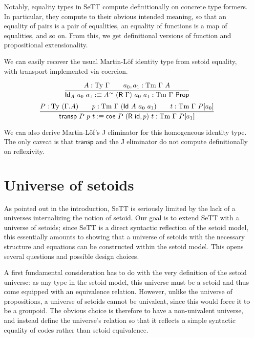 \documentclass{easychair}
\newcommand{\GG}{\Gamma}
\newcommand{\R}{\textsf{R}}
\newcommand{\Id}{\textsf{Id}}
\newcommand{\coe}{\textsf{coe}}
\newcommand{\tyj}[2]{#2 : \Ty\ #1}
\newcommand{\tmj}[3]{#2 : \Tm\ #1\ #3}
\newcommand{\Prop}{\textsf{Prop}}
\newcommand{\Ty}{\mathrm{Ty}}
\newcommand{\Tm}{\mathrm{Tm}}
\begin{document}
Notably, equality types in SeTT compute definitionally on concrete type
formers. In particular, they compute to their obvious intended meaning, so that
an equality of pairs is a pair of equalities, an equality of functions is a map
of equalities, and so on. From this, we get definitional versions of function
and propositional extensionality.

We can easily recover the usual Martin-L\"of identity type from setoid equality,
with transport implemented via coercion.

\[
\infer{
  \textsf{Id}_A\ a_0\ a_1 :\equiv A^{\sim}\ (\R\ \GG)\ a_0\ a_1 : \Tm\ \GG\ \Prop
}{
  \tyj{\GG}{A} \qquad \tmj{\GG}{a_0, a_1}{A}
}
\]
\[
\infer{
  \textsf{transp}\ P\ p\ t :\equiv
    \coe\ P\ (\textsf{R}\ \textsf{id} , p)\ t : \Tm\ \GG\ P[a_1]
}{
  P : \Ty\ (\GG . A)
  \qquad
  p : \Tm\ \GG\ (\Id\ A\ a_0\ a_1)
  \qquad
  t : \Tm\ \GG\ P[a_0]
}
\]

We can also derive Martin-L\"of's J eliminator for this homogeneous identity
type. The only caveat is that $\textsf{transp}$ and the J eliminator do not
compute definitionally on reflexivity.

\section{Universe of setoids}\label{setoid-universe}

As pointed out in the introduction, SeTT is seriously limited by the lack of a
universes internalizing the notion of setoid. Our goal is to extend SeTT with a
universe of setoids; since SeTT is a direct syntactic reflection of the setoid
model, this essentially amounts to showing that a universe of setoids with the
necessary structure and equations can be constructed within the setoid
model. This opens several questions and possible design choices.

A first fundamental consideration has to do with the very definition of the setoid
universe: as any type in the setoid model, this universe must be a setoid and
thus come equipped with an equivalence relation. However, unlike the universe of
propositions, a universe of setoids cannot be univalent, since this would force
it to be a groupoid. The obvious choice is therefore to have a non-univalent
universe, and instead define the universe's relation so that it reflects a
simple syntactic equality of codes rather than setoid equivalence.
\end{document}
